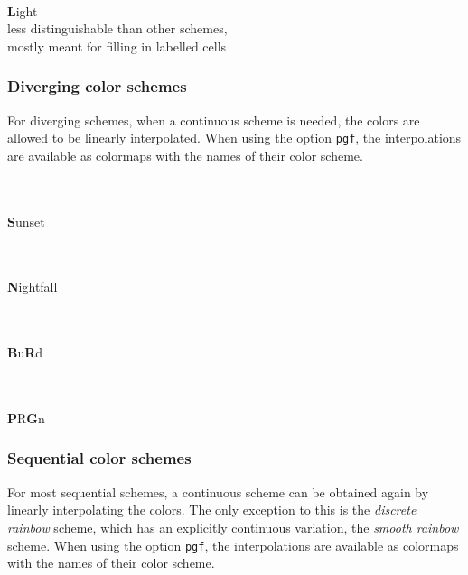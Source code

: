 \documentclass{scrartcl}
\begin{document}
\begin{center}
	\\
	\textbf{L}ight\\
	less distinguishable than other schemes,\\ mostly meant for filling in labelled cells
\end{center}\clearpage

\subsubsection{Diverging color schemes}\label{sec:T-D}
For diverging schemes, when a continuous scheme is needed, the colors are allowed to be linearly interpolated.
When using the option \texttt{pgf}, the interpolations are available as colormaps with the names of their color scheme.

\begin{center}
	\\
	\\
	\textbf{S}unset
\end{center}

\begin{center}
	\\
	\\
	\textbf{N}ightfall
\end{center}

\begin{center}
	\\
	\\
	\textbf{B}u\textbf{R}d
\end{center}

\begin{center}
	\\
	\\
	\textbf{P}R\textbf{G}n
\end{center}\clearpage

\subsubsection{Sequential color schemes}\label{sec:T-S}
For most sequential schemes, a continuous scheme can be obtained again by linearly interpolating the colors.
The only exception to this is the \emph{discrete rainbow} scheme, which has an explicitly continuous variation, the \emph{smooth rainbow} scheme.
When using the option \texttt{pgf}, the interpolations are available as colormaps with the names of their color scheme.
\end{document}
